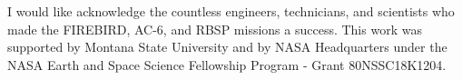 
I would like acknowledge the countless engineers, technicians, and scientists who made the FIREBIRD, AC-6, and RBSP missions a success. This work was supported by Montana State University and by NASA Headquarters under the NASA Earth and Space Science Fellowship Program - Grant 80NSSC18K1204.
